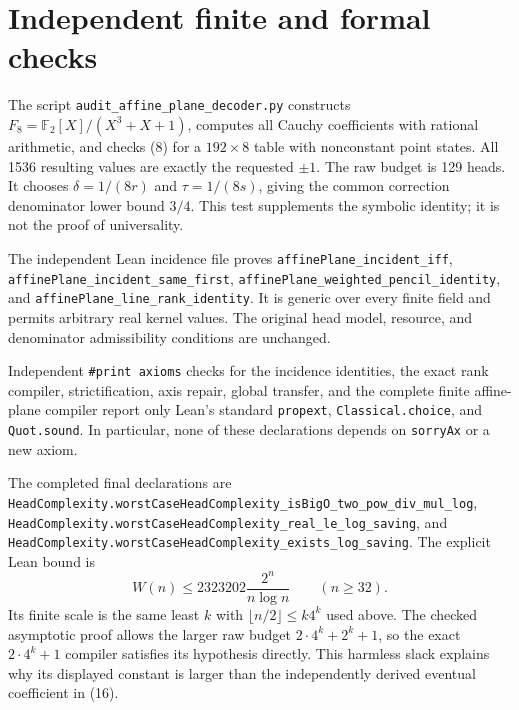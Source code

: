 \documentclass[11pt]{article}
\begin{document}
\section{Independent finite and formal checks}
The script \texttt{audit\_affine\_plane\_decoder.py} constructs
$F_8=\mathbb F_2[X]/(X^3+X+1)$, computes all Cauchy coefficients
with rational arithmetic, and checks (8) for a $192\times8$ table
with nonconstant point states. All 1536 resulting values are exactly
the requested $\pm1$. The raw budget is 129 heads. It chooses
$\delta=1/(8r)$ and $\tau=1/(8s)$, giving the common correction
denominator lower bound $3/4$. This test supplements the symbolic
identity; it is not the proof of universality.

The independent Lean incidence file proves
\texttt{affinePlane\_incident\_iff},
\texttt{affinePlane\_incident\_same\_first},
\texttt{affinePlane\_weighted\_pencil\_identity}, and
\texttt{affinePlane\_line\_rank\_identity}. It is generic over
every finite field and permits arbitrary real kernel values.
The original head model, resource, and denominator admissibility
conditions are unchanged.

Independent \texttt{\#print axioms} checks for the incidence identities,
the exact rank compiler, strictification, axis repair, global transfer,
and the complete finite affine-plane compiler report only Lean's
standard \texttt{propext}, \texttt{Classical.choice}, and
\texttt{Quot.sound}. In particular, none of these declarations depends
on \texttt{sorryAx} or a new axiom.

The completed final declarations are
\texttt{HeadComplexity.worstCaseHeadComplexity\_isBigO\_two\_pow\_div\_mul\_log},
\texttt{HeadComplexity.worstCaseHeadComplexity\_real\_le\_log\_saving},
and \texttt{HeadComplexity.worstCaseHeadComplexity\_exists\_log\_saving}.
The explicit Lean bound is
\[
 W(n)\le2323202\frac{2^n}{n\log n}\qquad(n\ge32).
\]
Its finite scale is the same least $k$ with
$\lfloor n/2\rfloor\le k4^k$ used above. The checked asymptotic
proof allows the larger raw budget $2\cdot4^k+2^k+1$, so the exact
$2\cdot4^k+1$ compiler satisfies its hypothesis directly. This
harmless slack explains why its displayed constant is larger than
the independently derived eventual coefficient in (16).
\end{document}
